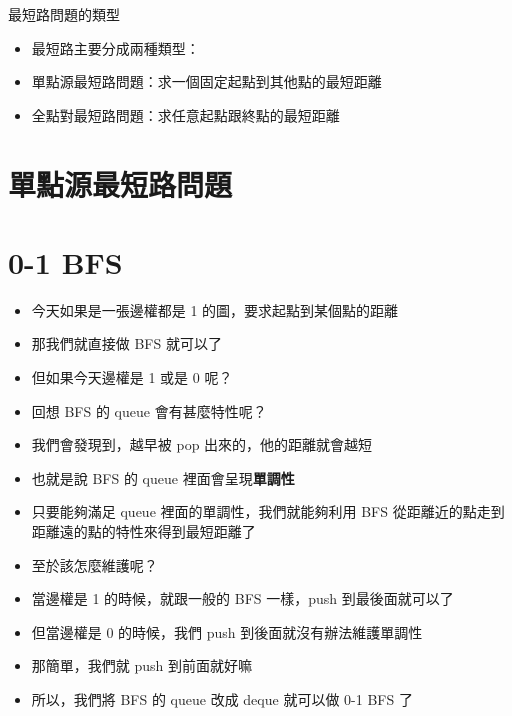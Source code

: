 \documentclass[aspectratio=169]{beamer}
\begin{document}
    \begin{frame}{最短路問題的類型}
        \begin{itemize}
            \item<1-> 最短路主要分成兩種類型：
            \item<2-> 單點源最短路問題：求一個固定起點到其他點的最短距離
            \item<2-> 全點對最短路問題：求任意起點跟終點的最短距離
        \end{itemize}
    \end{frame}

    \section{單點源最短路問題}

    \section{0-1 BFS}

    \begin{frame}
        \begin{itemize}
            \item<1-> 今天如果是一張邊權都是 1 的圖，要求起點到某個點的距離
            \item<2-> 那我們就直接做 BFS 就可以了
            \item<3-> 但如果今天邊權是 1 或是 0 呢？
        \end{itemize}
    \end{frame}

    \begin{frame}
        \begin{itemize}
            \item<1-> 回想 BFS 的 queue 會有甚麼特性呢？
            \item<2-> 我們會發現到，越早被 pop 出來的，他的距離就會越短
            \item<3-> 也就是說 BFS 的 queue 裡面會呈現\textbf{單調性}
            \item<4-> 只要能夠滿足 queue 裡面的單調性，我們就能夠利用 BFS 從距離近的點走到距離遠的點的特性來得到最短距離了
        \end{itemize}
    \end{frame}

    \begin{frame}
        \begin{itemize}
            \item<1-> 至於該怎麼維護呢？
            \item<2-> 當邊權是 1 的時候，就跟一般的 BFS 一樣，push 到最後面就可以了
            \item<3-> 但當邊權是 0 的時候，我們 push 到後面就沒有辦法維護單調性
            \item<4-> 那簡單，我們就 push 到前面就好嘛
            \item<4-> 所以，我們將 BFS 的 queue 改成 deque 就可以做 0-1 BFS 了
        \end{itemize}
    \end{frame}
\end{document}
